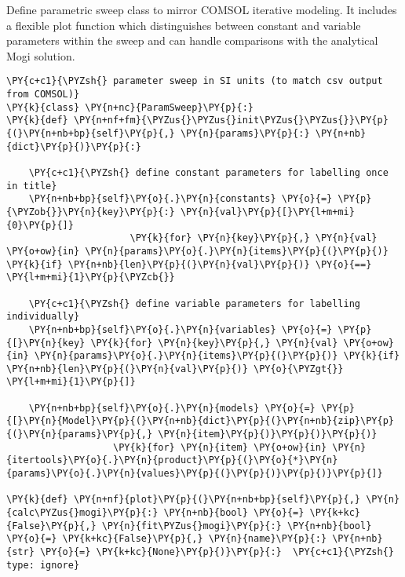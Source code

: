 Define parametric sweep class to mirror COMSOL iterative modeling. It
includes a flexible plot function which distinguishes between constant
and variable parameters within the sweep and can handle comparisons with
the analytical Mogi solution.

\begin{tcolorbox}[breakable, size=fbox, boxrule=1pt, pad at break*=1mm,colback=cellbackground, colframe=cellborder]
\begin{Verbatim}[commandchars=\\\{\}]
\PY{c+c1}{\PYZsh{} parameter sweep in SI units (to match csv output from COMSOL)}
\PY{k}{class} \PY{n+nc}{ParamSweep}\PY{p}{:}
\PY{k}{def} \PY{n+nf+fm}{\PYZus{}\PYZus{}init\PYZus{}\PYZus{}}\PY{p}{(}\PY{n+nb+bp}{self}\PY{p}{,} \PY{n}{params}\PY{p}{:} \PY{n+nb}{dict}\PY{p}{)}\PY{p}{:}

    \PY{c+c1}{\PYZsh{} define constant parameters for labelling once in title}
    \PY{n+nb+bp}{self}\PY{o}{.}\PY{n}{constants} \PY{o}{=} \PY{p}{\PYZob{}}\PY{n}{key}\PY{p}{:} \PY{n}{val}\PY{p}{[}\PY{l+m+mi}{0}\PY{p}{]}
                      \PY{k}{for} \PY{n}{key}\PY{p}{,} \PY{n}{val} \PY{o+ow}{in} \PY{n}{params}\PY{o}{.}\PY{n}{items}\PY{p}{(}\PY{p}{)} \PY{k}{if} \PY{n+nb}{len}\PY{p}{(}\PY{n}{val}\PY{p}{)} \PY{o}{==} \PY{l+m+mi}{1}\PY{p}{\PYZcb{}}

    \PY{c+c1}{\PYZsh{} define variable parameters for labelling individually}
    \PY{n+nb+bp}{self}\PY{o}{.}\PY{n}{variables} \PY{o}{=} \PY{p}{[}\PY{n}{key} \PY{k}{for} \PY{n}{key}\PY{p}{,} \PY{n}{val} \PY{o+ow}{in} \PY{n}{params}\PY{o}{.}\PY{n}{items}\PY{p}{(}\PY{p}{)} \PY{k}{if} \PY{n+nb}{len}\PY{p}{(}\PY{n}{val}\PY{p}{)} \PY{o}{\PYZgt{}} \PY{l+m+mi}{1}\PY{p}{]}

    \PY{n+nb+bp}{self}\PY{o}{.}\PY{n}{models} \PY{o}{=} \PY{p}{[}\PY{n}{Model}\PY{p}{(}\PY{n+nb}{dict}\PY{p}{(}\PY{n+nb}{zip}\PY{p}{(}\PY{n}{params}\PY{p}{,} \PY{n}{item}\PY{p}{)}\PY{p}{)}\PY{p}{)}
                   \PY{k}{for} \PY{n}{item} \PY{o+ow}{in} \PY{n}{itertools}\PY{o}{.}\PY{n}{product}\PY{p}{(}\PY{o}{*}\PY{n}{params}\PY{o}{.}\PY{n}{values}\PY{p}{(}\PY{p}{)}\PY{p}{)}\PY{p}{]}

\PY{k}{def} \PY{n+nf}{plot}\PY{p}{(}\PY{n+nb+bp}{self}\PY{p}{,} \PY{n}{calc\PYZus{}mogi}\PY{p}{:} \PY{n+nb}{bool} \PY{o}{=} \PY{k+kc}{False}\PY{p}{,} \PY{n}{fit\PYZus{}mogi}\PY{p}{:} \PY{n+nb}{bool} \PY{o}{=} \PY{k+kc}{False}\PY{p}{,} \PY{n}{name}\PY{p}{:} \PY{n+nb}{str} \PY{o}{=} \PY{k+kc}{None}\PY{p}{)}\PY{p}{:}  \PY{c+c1}{\PYZsh{} type: ignore}


\end{Verbatim}
\end{tcolorbox}
